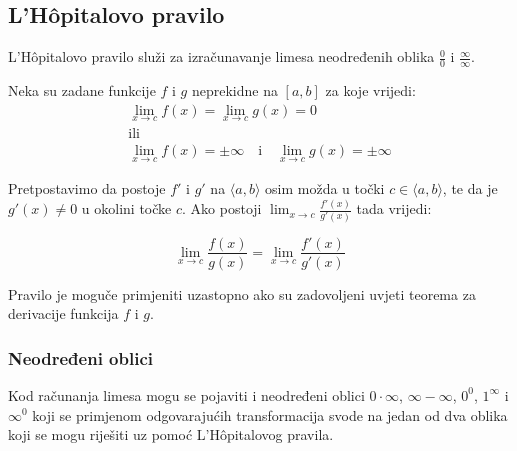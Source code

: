 \subsection{L'Hôpitalovo pravilo}

L'Hôpitalovo pravilo služi za izračunavanje limesa neodređenih oblika $\frac{0}{0}$
i $\frac{\infty}{\infty}$.

\begin{definition}
    \label{def:lhopital}

    Neka su zadane funkcije $f$ i $g$ neprekidne na $[a,b]$ za koje vrijedi:
    \begin{gather*}
        \lim_{x\to c}f(x) = \lim_{x\to c}g(x) = 0\\
        \text{ili}\\
        \lim_{x\to c}f(x) = \pm\infty\quad\text{i}\quad\lim_{x\to c}g(x)=\pm\infty
    \end{gather*}

    Pretpostavimo da postoje $f'$ i $g'$ na $\langle a,b\rangle$ osim možda u točki $c\in\langle a,b\rangle$,
    te da je $g'(x)\neq 0$ u okolini točke $c$. Ako postoji $\lim_{x\to c}\frac{f'(x)}{g'(x)}$ tada vrijedi:

    \center
    \begin{equation*}
        \lim_{x\to c}\frac{f(x)}{g(x)} = \lim_{x\to c}\frac{f'(x)}{g'(x)}
    \end{equation*}
\end{definition}

Pravilo je moguče primjeniti uzastopno ako su zadovoljeni uvjeti teorema za
derivacije funkcija $f$ i $g$.

\subsubsection{Neodređeni oblici}

Kod računanja limesa mogu se pojaviti i neodređeni oblici $0\cdot\infty$, $\infty - \infty$,
$0^0$, $1^\infty$ i $\infty^0$ koji se primjenom odgovarajućih transformacija svode na
jedan od dva oblika koji se mogu riješiti uz pomoć L'Hôpitalovog pravila.

